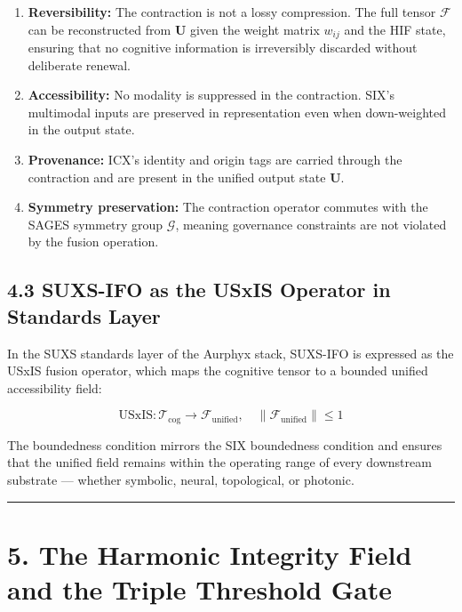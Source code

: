 \begin{enumerate}
\def\labelenumi{\arabic{enumi}.}
\tightlist
\item
  \textbf{Reversibility:} The contraction is not a lossy compression. The full tensor \(\mathcal{F}\) can be reconstructed from \(\mathbf{U}\) given the weight matrix \(w_{ij}\) and the HIF state, ensuring that no cognitive information is irreversibly discarded without deliberate renewal.
\item
  \textbf{Accessibility:} No modality is suppressed in the contraction. SIX's multimodal inputs are preserved in representation even when down-weighted in the output state.
\item
  \textbf{Provenance:} ICX's identity and origin tags are carried through the contraction and are present in the unified output state \(\mathbf{U}\).
\item
  \textbf{Symmetry preservation:} The contraction operator commutes with the SAGES symmetry group \(\mathcal{G}\), meaning governance constraints are not violated by the fusion operation.
\end{enumerate}

\subsection{4.3 SUXS-IFO as the USxIS Operator in Standards Layer}\label{suxs-ifo-as-the-usxis-operator-in-standards-layer}

In the SUXS standards layer of the Aurphyx stack, SUXS-IFO is expressed as the USxIS fusion operator, which maps the cognitive tensor to a bounded unified accessibility field:

\[
\mathrm{USxIS}: \mathcal{T}_{\text{cog}} \rightarrow \mathcal{F}_{\text{unified}},
\quad \|\mathcal{F}_{\text{unified}}\| \leq 1
\]

The boundedness condition mirrors the SIX boundedness condition and ensures that the unified field remains within the operating range of every downstream substrate --- whether symbolic, neural, topological, or photonic.

\begin{center}\rule{0.5\linewidth}{0.5pt}\end{center}

\section{5. The Harmonic Integrity Field and the Triple Threshold Gate}\label{the-harmonic-integrity-field-and-the-triple-threshold-gate}

